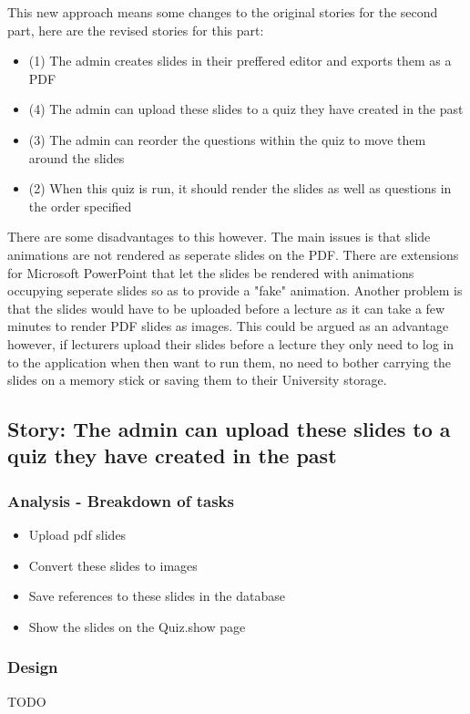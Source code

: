 This new approach means some changes to the original stories for the second part, here are the revised stories for this part:
\begin{itemize}
	\item (1) The admin creates slides in their preffered editor and exports them as a PDF
	\item (4) The admin can upload these slides to a quiz they have created in the past
	\item (3) The admin can reorder the questions within the quiz to move them around the slides
	\item (2) When this quiz is run, it should render the slides as well as questions in the order specified
\end{itemize}

There are some disadvantages to this however. The main issues is that slide animations are not rendered as seperate slides on the PDF. There are extensions for Microsoft PowerPoint that let the slides be rendered with animations occupying seperate slides so as to provide a "fake" animation. Another problem is that the slides would have to be uploaded before a lecture as it can take a few minutes to render PDF slides as images. This could be argued as an advantage however, if lecturers upload their slides before a lecture they only need to log in to the application when then want to run them, no need to bother carrying the slides on a memory stick or saving them to their University storage.
\newpage

\subsection{Story: The admin can upload these slides to a quiz they have created in the past}
\subsubsection{Analysis - Breakdown of tasks}
\begin{itemize}
	\item Upload pdf slides
	\item Convert these slides to images
	\item Save references to these slides in the database
	\item Show the slides on the Quiz.show page
\end{itemize}
\subsubsection{Design}
TODO
